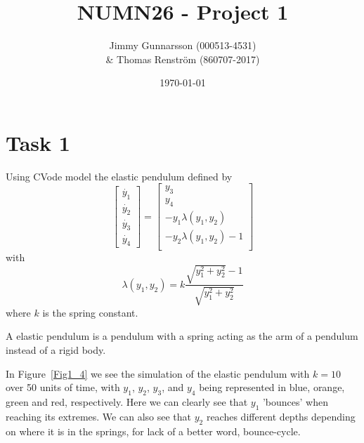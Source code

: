 \documentclass{article}
\begin{document}
\title{NUMN26 - Project 1}
\author{Jimmy Gunnarsson (000513-4531) \\
        & Thomas Renström (860707-2017)}
\date{\today}
\maketitle
\newpage
\section{Task 1}
Using CVode model the elastic pendulum defined by
\[
\begin{bmatrix}
\dot{y_1}\\
\dot{y_2}\\
\dot{y_3}\\
\dot{y_4}
\end{bmatrix}
=
\begin{bmatrix}
y_3\\
y_4\\
-y_1 \lambda(y_1,y_2)\\
-y_2 \lambda(y_1,y_2) -1\\
\end{bmatrix}
\]
with
\[\lambda(y_1, y_2) = k \frac{\sqrt{y_1^2 + y_2^2}-1}{\sqrt{y_1^2 + y_2^2}}\]
where \(k\) is the spring constant.


A elastic pendulum is a pendulum with a spring acting as the arm of a pendulum instead of a rigid body.



In Figure~\ref{Fig1_4} we see the simulation of the elastic pendulum with \(k=10\) over 50 units of time, with \(y_1\), \(y_2\), \(y_3\), and \(y_4\) being represented in blue, orange, green and red, respectively. Here we can clearly see that \(y_1\) 'bounces' when reaching its extremes. We can also see that \(y_2\) reaches different depths depending on where it is in the springs, for lack of a better word, bounce-cycle.


\end{document}
